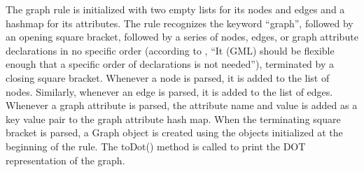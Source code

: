 \documentclass[a4paper]{report}
\begin{document}
The graph rule is initialized with two empty lists for its nodes and edges and a hashmap for its attributes. The rule recognizes the keyword ``graph'', followed by an opening square bracket, followed by a series of nodes, edges, or graph attribute declarations in no specific order (according to \cite{GML}, ``It (GML) should be flexible enough that a specific order of declarations is not needed''), terminated by a closing square bracket. Whenever a node is parsed, it is added to the list of nodes. Similarly, whenever an edge is parsed, it is added to the list of edges. Whenever a graph attribute is parsed, the attribute name and value is added as a key value pair to the graph attribute hash map. When the terminating square bracket is parsed, a Graph object is created using the objects initialized at the beginning of the rule. The toDot() method is called to print the DOT representation of the graph. 
\end{document}
